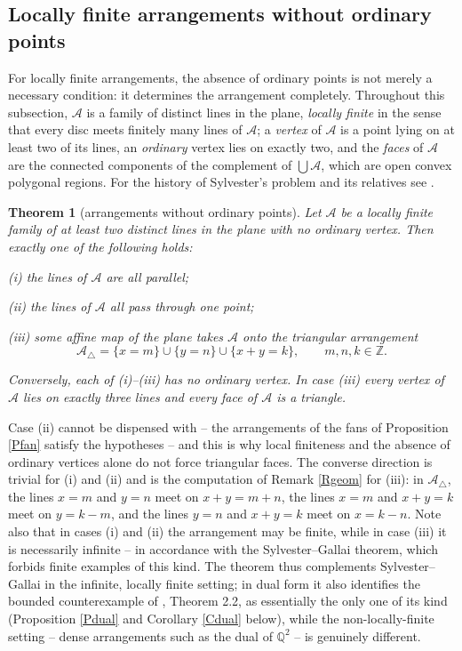\documentclass{article}
\newtheorem{theorem}{Theorem}
\def\Z{{\mathbb Z}}
\begin{document}
	\subsection{Locally finite arrangements without ordinary points}

	For locally finite arrangements, the absence of ordinary points is not merely a necessary condition: it determines the arrangement completely. Throughout this subsection, $\mathcal A$ is a family of distinct lines in the plane, \emph{locally finite} in the sense that every disc meets finitely many lines of $\mathcal A$; a \emph{vertex} of $\mathcal A$ is a point lying on at least two of its lines, an \emph{ordinary} vertex lies on exactly two, and the \emph{faces} of $\mathcal A$ are the connected components of the complement of $\bigcup\mathcal A$, which are open convex polygonal regions. For the history of Sylvester's problem and its relatives see \cite{BM}.

	\begin{theorem}[arrangements without ordinary points]\label{Tarr}
		Let $\mathcal A$ be a locally finite family of at least two distinct lines in the plane with no ordinary vertex. Then exactly one of the following holds:

		\emph{(i)} the lines of $\mathcal A$ are all parallel;

		\emph{(ii)} the lines of $\mathcal A$ all pass through one point;

		\emph{(iii)} some affine map of the plane takes $\mathcal A$ onto the triangular arrangement
		$$\mathcal A_\triangle=\{x=m\}\cup\{y=n\}\cup\{x+y=k\},\qquad m,n,k\in\Z .$$

		\noindent Conversely, each of \emph{(i)--(iii)} has no ordinary vertex. In case \emph{(iii)} every vertex of $\mathcal A$ lies on exactly three lines and every face of $\mathcal A$ is a triangle.
	\end{theorem}

	Case (ii) cannot be dispensed with -- the arrangements of the fans of Proposition \ref{Pfan} satisfy the hypotheses -- and this is why local finiteness and the absence of ordinary vertices alone do not force triangular faces. The converse direction is trivial for (i) and (ii) and is the computation of Remark \ref{Rgeom} for (iii): in $\mathcal A_\triangle$, the lines $x=m$ and $y=n$ meet on $x+y=m+n$, the lines $x=m$ and $x+y=k$ meet on $y=k-m$, and the lines $y=n$ and $x+y=k$ meet on $x=k-n$. Note also that in cases (i) and (ii) the arrangement may be finite, while in case (iii) it is necessarily infinite -- in accordance with the Sylvester--Gallai theorem, which forbids finite examples of this kind. The theorem thus complements Sylvester--Gallai in the infinite, locally finite setting; in dual form it also identifies the bounded counterexample of \cite{BDSYZ}, Theorem 2.2, as essentially the only one of its kind (Proposition \ref{Pdual} and Corollary \ref{Cdual} below), while the non-locally-finite setting -- dense arrangements such as the dual of $\mathbb Q^2$ -- is genuinely different.
\end{document}
